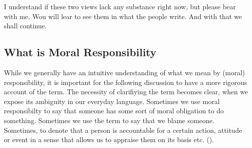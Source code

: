 \documentclass{article}
\begin{document}
I understand if these two views lack any substance right now, but please bear
with me. Wou will lear to see them in what the people write. And with that we
shall continue.

\subsection{What is Moral Responsibility}

While we generally have an intuitive understanding of what we mean
by (moral) responsibility, it is important for the following discussion to have
a more rigorous account of the term. The necessity of clarifiying the term
becomes clear, when we expose its ambiguity in our everyday language.
Sometimes we use moral responsibilty to say that someone has some sort of moral
obligation to do something. Sometimes we use the term to say that we blame
someone. Sometimes, to denote that a person is accountable for a certain action,
attitude or event in a sense that allows us to appraise them on its basis etc. (\cite[p. 469]{Smith_2007}).

%
\end{document}
